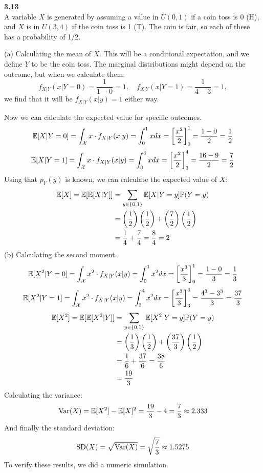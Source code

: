 \bigskip\noindent
\textbf{3.13}\\  %
A variable $X$ is generated by assuming a value in $U(0,1)$ if a coin toss
is 0 (H), and $X$ is in $U(3,4)$ if the coin toss is 1 (T). The coin is fair, so
each of these has a probability of 1/2.

\medskip\noindent(a) Calculating the mean of $X$. This will be a conditional expectation,
and we define $Y$ to be the coin toss. The marginal distributions might depend on the outcome,
but when we calculate them:
$$
f_{X|Y}(x|Y=0) = \frac{1}{1-0} = 1, \quad
f_{X|Y}(x|Y=1) = \frac{1}{4-3} = 1,
$$
we find that it will be $f_{X|Y}(x|y) = 1$ either way.

\newpage\noindent
Now we can calculate the expected value for specific outcomes.
$$
\mathbb{E}[X|Y=0] =  \int_{\mathcal{X}}x\cdot f_{X|Y}(x|y) = \int_0^1 x dx = \left[\frac{x^2}{2}\right]_0^1 = \frac{1-0}{2} = \frac{1}{2}
$$
$$
\mathbb{E}[X|Y=1] = \int_{\mathcal{X}}x\cdot f_{X|Y}(x|y) = \int_3^4 x dx = \left[\frac{x^2}{2}\right]_3^4 = \frac{16-9}{2} = \frac{7}{2}
$$
Using that $p_Y(y)$ is known, we can calculate the expected value of $X$:
\begin{align*}
    \mathbb{E}[X] = \mathbb{E}[\mathbb{E}[X|Y]] &= \sum_{y\in\{0,1\}}\mathbb{E}[X|Y=y]\mathbb{P}(Y=y) \\
    &= \left(\frac{1}{2}\right)\left(\frac{1}{2}\right) + \left(\frac{7}{2}\right)\left(\frac{1}{2}\right) \\
    &= \frac{1}{4} + \frac{7}{4} = \frac{8}{4} = 2
\end{align*}
(b) Calculating the second moment.
$$
\mathbb{E}[X^2|Y=0] =  \int_{\mathcal{X}}x^2\cdot f_{X|Y}(x|y) = \int_0^1 x^2 dx = \left[\frac{x^3}{3}\right]_0^1 = \frac{1-0}{3} = \frac{1}{3}
$$
$$
\mathbb{E}[X^2|Y=1] = \int_{\mathcal{X}}x^2\cdot f_{X|Y}(x|y) = \int_3^4 x^2 dx = \left[\frac{x^3}{3}\right]_3^4 = \frac{4^3-3^3}{3} = \frac{37}{3}
$$
\begin{align*}
    \mathbb{E}[X^2] = \mathbb{E}[\mathbb{E}[X^2|Y]] &= \sum_{y\in\{0,1\}}\mathbb{E}[X^2|Y=y]\mathbb{P}(Y=y) \\
    &= \left(\frac{1}{3}\right)\left(\frac{1}{2}\right) + \left(\frac{37}{3}\right)\left(\frac{1}{2}\right) \\
    &= \frac{1}{6} + \frac{37}{6} = \frac{38}{6} \\
    &= \frac{19}{3}
\end{align*}
Calculating the variance:
$$
\text{Var}(X) = \mathbb{E}[X^2] - \mathbb{E}[X]^2 = \frac{19}{3} - 4 = \frac{7}{3} \approx 2.333
$$
And finally the standard deviation:
$$
\text{SD}(X) = \sqrt{\text{Var}(X)} = \sqrt{\frac{7}{3}} \approx 1.5275
$$
To verify these results, we did a numeric simulation.

